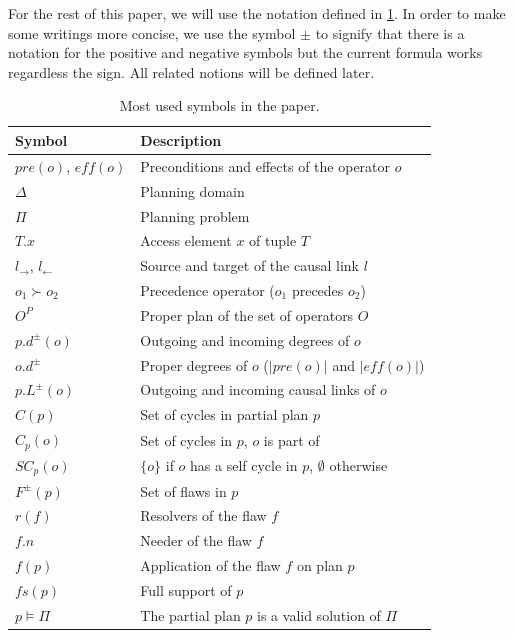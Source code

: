 For the rest of this paper, we will use the notation defined in
\cref{tbl:symbols}. In order to make some writings more concise, we use
the symbol \(\pm\) to signify that there is a notation for the positive
and negative symbols but the current formula works regardless the sign.
All related notions will be defined later.

\begin{table}\footnotesize
\centering

\caption{\label{tbl:symbols}Most used symbols in the paper. }

\begin{tabular}{@{}ll@{}}
\toprule

Symbol & Description \\\midrule

\(pre(o)\), \(eff(o)\) & Preconditions and effects of the operator
\(o\) \\
\(\Delta\) & Planning domain \\
\(\Pi\) & Planning problem \\
\(T.x\) & Access element \(x\) of tuple \(T\) \\
\(l_{\rightarrow}\), \(l_{\leftarrow}\) & Source and target of the
causal link \(l\) \\
\(o_1 \succ o_2\) & Precedence operator (\(o_1\) precedes \(o_2\)) \\
\(O^P\) & Proper plan of the set of operators \(O\) \\
\(p.d^\pm(o)\) & Outgoing and incoming degrees of \(o\) \\
\(o.d^\pm\) & Proper degrees of \(o\) (\(|pre(o)|\) and \(|eff(o)|\)) \\
\(p.L^\pm(o)\) & Outgoing and incoming causal links of \(o\) \\
\(C(p)\) & Set of cycles in partial plan \(p\) \\
\(C_p(o)\) & Set of cycles in \(p\), \(o\) is part of \\
\(SC_p(o)\) & \(\{o\}\) if \(o\) has a self cycle in \(p\),
\(\emptyset\) otherwise \\
\(F^\pm(p)\) & Set of flaws in \(p\) \\
\(r(f)\) & Resolvers of the flaw \(f\) \\
\(f.n\) & Needer of the flaw \(f\) \\
\(f(p)\) & Application of the flaw \(f\) on plan \(p\) \\
\(fs(p)\) & Full support of \(p\) \\
\(p \models \Pi\) & The partial plan \(p\) is a valid solution of
\(\Pi\) \\

\bottomrule
\end{tabular}

\end{table}

